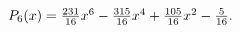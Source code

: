 $\mathop{P_{6}\/}\nolimits\!\left(x\right)=\tfrac{231}{16}x^{6}-\tfrac{315}{16}%
x^{4}+\tfrac{105}{16}x^{2}-\tfrac{5}{16}.$